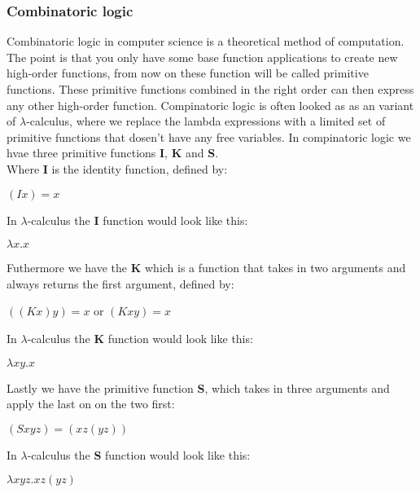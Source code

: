 \subsubsection{Combinatoric logic}
Combinatoric logic in computer science is a theoretical method of computation. The point is that you only have some base function
applications to create new high-order functions, from now on these function will be called primitive functions. These primitive functions
combined in the right order can then express any other high-order function.  
Compinatoric logic is often looked as as an variant of $\lambda$-calculus, where 
we replace the lambda expressions with a limited set of primitive functions that dosen't have any free variables. In compinatoric logic
we hvae three primitive functions \textbf{I}, \textbf{K} and \textbf{S}.\\
Where \textbf{I} is the identity function, defined by: \\ 
\begin{center}
    $(I x) = x$\\    
\end{center}
In $\lambda$-calculus the \textbf{I} function would look like this:\\
\begin{center}
    $\lambda x.x$\\    
\end{center}
Futhermore we have the \textbf{K} which is a function that takes in two arguments and always returns the first argument, defined by:
\begin{center}
    $ ((K x) y) = x$ or $(K x y) = x$\\    
\end{center}
In $\lambda$-calculus the \textbf{K} function would look like this:\\
\begin{center}
    $\lambda xy.x$\\    
\end{center}
Lastly we have the primitive function \textbf{S}, which takes in three arguments and apply the last on on the two first:
\begin{center}
    $ (S x y z) = (x z (y z))$\\    
\end{center}
In $\lambda$-calculus the \textbf{S} function would look like this:\\
\begin{center}
    $\lambda xyz.xz(yz)$\\    
\end{center}
